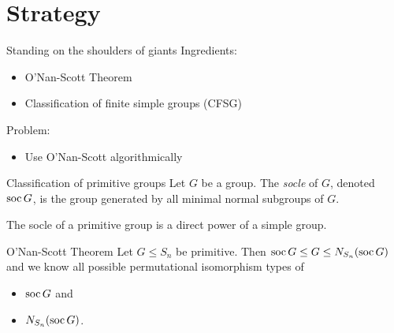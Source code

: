 \documentclass{beamer}
\theoremstyle{plain}
\theoremstyle{definition}
\begin{document}
%


\section{Strategy}
\begin{frame}{Standing on the shoulders of giants}
Ingredients:
\begin{itemize}
\item O'Nan-Scott Theorem
\item Classification of finite simple groups (CFSG)
\end{itemize}

\pause
Problem:
\begin{itemize}
\item Use O'Nan-Scott algorithmically
\end{itemize}

\end{frame}



\begin{frame}{Classification of primitive groups}
Let $G$ be a group. The \emph{socle} of $G$, denoted $\operatorname{soc} G$,
is the group generated by all minimal normal subgroups of $G$.

The socle of a primitive group is a direct power of a simple group.
\pause
\begin{block}{O'Nan-Scott Theorem}
    Let $G \leq S_n$ be primitive.
    Then $\operatorname{soc} G \leq G \leq N_{S_n}(\operatorname{soc} G)$
    and we know all possible permutational isomorphism types of
    \vspace{-0.5em}
    \begin{itemize}
        \item
        $\operatorname{soc} G$ and
        \item
        $N_{S_n}(\operatorname{soc} G)$.
    \end{itemize}
\end{block}
\end{frame}
\end{document}
